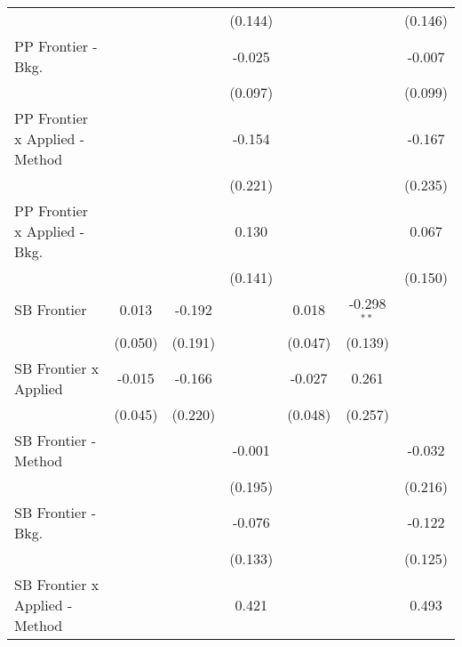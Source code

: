 \begin{tabular}{lcccccc}
                                  &                &                & (0.144)        &                &               & (0.146)\\   
   PP Frontier - Bkg.             &                &                & -0.025         &                &               & -0.007\\   
                                  &                &                & (0.097)        &                &               & (0.099)\\   
   PP Frontier x Applied - Method &                &                & -0.154         &                &               & -0.167\\   
                                  &                &                & (0.221)        &                &               & (0.235)\\   
   PP Frontier x Applied - Bkg.   &                &                & 0.130          &                &               & 0.067\\   
                                  &                &                & (0.141)        &                &               & (0.150)\\   
   SB Frontier                    & 0.013          & -0.192         &                & 0.018          & -0.298$^{**}$ &   \\   
                                  & (0.050)        & (0.191)        &                & (0.047)        & (0.139)       &   \\   
   SB Frontier x Applied          & -0.015         & -0.166         &                & -0.027         & 0.261         &   \\   
                                  & (0.045)        & (0.220)        &                & (0.048)        & (0.257)       &   \\   
   SB Frontier - Method           &                &                & -0.001         &                &               & -0.032\\   
                                  &                &                & (0.195)        &                &               & (0.216)\\   
   SB Frontier - Bkg.             &                &                & -0.076         &                &               & -0.122\\   
                                  &                &                & (0.133)        &                &               & (0.125)\\   
   SB Frontier x Applied - Method &                &                & 0.421          &                &               & 0.493\\   

\end{tabular}
